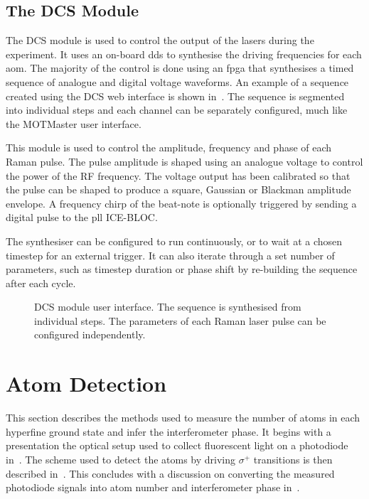 \subsection{The DCS Module}\label{subsec:dcs_module} 
The DCS module is used to control the
output of the lasers during the experiment. It uses an on-board
\ac{dds} to
synthesise the  driving frequencies for each \ac{aom}.
The majority of the control is done using an \ac{fpga} that synthesises a timed
sequence of analogue and digital voltage waveforms. An example of a sequence
created using the DCS web interface is shown in~. The
sequence is segmented into individual steps and each channel can be separately
configured, much like the MOTMaster user interface. \par\noindent This module is
used to control the amplitude, frequency and phase of each Raman pulse. The
pulse amplitude is shaped using an analogue voltage to control the power of the
RF frequency. The voltage output has been calibrated so that the pulse can be shaped to
produce a square, Gaussian or Blackman amplitude envelope. A frequency
chirp of the beat-note is
optionally triggered by sending a digital pulse to the \ac{pll} ICE-BLOC.
\par\noindent The synthesiser can be configured to run continuously, or to wait
at a chosen timestep for an external trigger. It can also iterate through a set
number of parameters, such as timestep duration or phase shift by re-building
the sequence after each cycle.  
\begin{figure}[!htbp] 
  \centering
	\caption[DCS Module User interface]{DCS module user interface. The sequence is
		synthesised from individual steps. The parameters of each Raman laser pulse
		can be configured independently.} 
  \label{fig:dcs_module} 
\end{figure}
\section{Atom Detection}\label{sec:atom_detection} 
This section describes the methods used to
measure the number of atoms in each hyperfine ground state and infer
the interferometer phase. It begins with a
presentation the optical setup used to collect fluorescent light on a
photodiode in~.
The scheme used to detect the atoms by
driving \(\sigma^+\) transitions is then described in~.
This concludes with a
discussion on converting the measured photodiode signals into atom
number and interferometer phase
in~.
